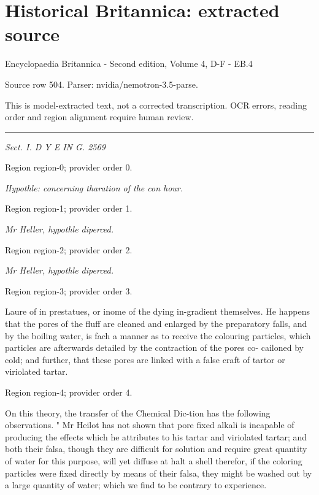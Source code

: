 \documentclass[11pt]{article}
\begin{document}
\section*{Historical Britannica: extracted source}
Encyclopaedia Britannica - Second edition, Volume 4, D-F - EB.4\par
{\small Source row 504. Parser: nvidia/nemotron-3.5-parse.\par}
{\small This is model-extracted text, not a corrected transcription. OCR errors, reading order and region alignment require human review.\par}
\hrule\medskip
{\small\itshape Sect. I. D Y E IN G. 2569\par}

{\scriptsize\color{gray} Region region-0; provider order 0.\par}
\medskip

{\small\itshape Hypothle:
concerning
tharation
of the con
hour.\par}

{\scriptsize\color{gray} Region region-1; provider order 1.\par}
\medskip

{\small\itshape Mr Heller,
hypothle
diperced.\par}

{\scriptsize\color{gray} Region region-2; provider order 2.\par}
\medskip

{\small\itshape Mr Heller,
hypothle
diperced.\par}

{\scriptsize\color{gray} Region region-3; provider order 3.\par}
\medskip

Laure of in prestatues, or inome of the dying in-gradient themselves. He happens that the pores of the fluff are cleaned and enlarged by the preparatory
falls, and by the boiling water, is fach a manner as to receive the colouring particles, which particles are afterwards detailed by the contraction of the pores co- cailoned by cold; and further, that these pores are linked with a false craft of tartor or viriolated tartar.
\par

{\scriptsize\color{gray} Region region-4; provider order 4.\par}
\medskip

On this theory, the transfer of the Chemical Dic-tion has the following observations. " Mr Heilot
has not shown that pore fixed alkali is incapable of producing the effects which he attributes to his tartar and viriolated tartar; and both their falsa, though they are difficult for solution and require great quantity of water for this purpose, will yet diffuse at halt a shell therefor, if the coloring particles were fixed directly by means of their falsa, they might be washed out by a large quantity of water; which we find to be contrary to experience.
\par
\end{document}
